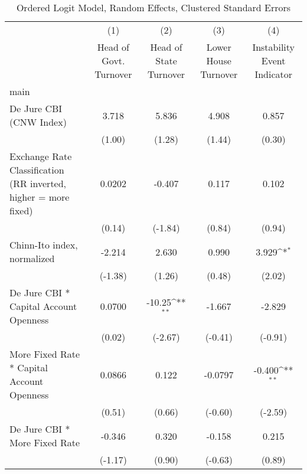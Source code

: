 {
\def\sym#1{\ifmmode^{#1}\else\(^{#1}\)\fi}
\begin{longtable}{l*{4}{c}}
\caption{Ordered Logit Model, Random Effects, Clustered Standard Errors \label{kapintlagordLogLogDJ}}\\
\hline\hline\endfirsthead\hline\endhead\hline\endfoot\endlastfoot
                &\multicolumn{1}{c}{(1)}&\multicolumn{1}{c}{(2)}&\multicolumn{1}{c}{(3)}&\multicolumn{1}{c}{(4)}\\
                &\multicolumn{1}{c}{Head of Govt. Turnover}&\multicolumn{1}{c}{Head of State Turnover}&\multicolumn{1}{c}{Lower House Turnover}&\multicolumn{1}{c}{Instability Event Indicator}\\
\hline
main            &                  &                  &                  &                  \\
De Jure CBI (CNW Index)&    3.718         &    5.836         &    4.908         &    0.857         \\
                &   (1.00)         &   (1.28)         &   (1.44)         &   (0.30)         \\
[1em]
Exchange Rate Classification (RR inverted, higher = more fixed)&   0.0202         &   -0.407         &    0.117         &    0.102         \\
                &   (0.14)         &  (-1.84)         &   (0.84)         &   (0.94)         \\
[1em]
Chinn-Ito index, normalized&   -2.214         &    2.630         &    0.990         &    3.929\sym{*}  \\
                &  (-1.38)         &   (1.26)         &   (0.48)         &   (2.02)         \\
[1em]
De Jure CBI * Capital Account Openness&   0.0700         &   -10.25\sym{**} &   -1.667         &   -2.829         \\
                &   (0.02)         &  (-2.67)         &  (-0.41)         &  (-0.91)         \\
[1em]
More Fixed Rate * Capital Account Openness&   0.0866         &    0.122         &  -0.0797         &   -0.400\sym{**} \\
                &   (0.51)         &   (0.66)         &  (-0.60)         &  (-2.59)         \\
[1em]
De Jure CBI * More Fixed Rate&   -0.346         &    0.320         &   -0.158         &    0.215         \\
                &  (-1.17)         &   (0.90)         &  (-0.63)         &   (0.89)         \\

\end{longtable}}
